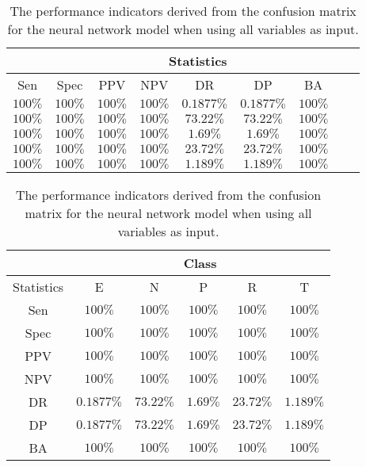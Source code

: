 \begin{table}[!ht]
	\centering
	\begin{tabular}{|c|c|c|c|c|c|c|c|c|}
		\hline
		 & \multicolumn{7}{c|}{Statistics} \\ \hline
		Sen & Spec & PPV & NPV & DR & DP & BA \\ \hline
		$100\%$ & $100\%$ & $100\%$ & $100\%$ & $0.1877\%$ & $0.1877\%$ & $100\%$ \\ \hline
		$100\%$ & $100\%$ & $100\%$ & $100\%$ & $73.22\%$ & $73.22\%$ & $100\%$ \\ \hline
		$100\%$ & $100\%$ & $100\%$ & $100\%$ & $1.69\%$ & $1.69\%$ & $100\%$ \\ \hline
		$100\%$ & $100\%$ & $100\%$ & $100\%$ & $23.72\%$ & $23.72\%$ & $100\%$ \\ \hline
		$100\%$ & $100\%$ & $100\%$ & $100\%$ & $1.189\%$ & $1.189\%$ & $100\%$ \\ \hline
	\end{tabular}
	\caption{The performance indicators derived from the confusion matrix for the neural network model when using all variables as input.}
	\label{tab:cs:all:nnet}
\end{table}

\begin{table}[!ht]
	\centering
	\begin{tabular}{|c|c|c|c|c|c|}
		\hline
		 & \multicolumn{5}{c|}{Class} \\ \hline
		Statistics & E & N & P & R & T \\ \hline
		Sen & $100\%$ & $100\%$ & $100\%$ & $100\%$ & $100\%$ \\ \hline
		Spec & $100\%$ & $100\%$ & $100\%$ & $100\%$ & $100\%$ \\ \hline
		PPV & $100\%$ & $100\%$ & $100\%$ & $100\%$ & $100\%$ \\ \hline
		NPV & $100\%$ & $100\%$ & $100\%$ & $100\%$ & $100\%$ \\ \hline
		DR & $0.1877\%$ & $73.22\%$ & $1.69\%$ & $23.72\%$ & $1.189\%$ \\ \hline
		DP & $0.1877\%$ & $73.22\%$ & $1.69\%$ & $23.72\%$ & $1.189\%$ \\ \hline
		BA & $100\%$ & $100\%$ & $100\%$ & $100\%$ & $100\%$ \\ \hline
	\end{tabular}
	\caption{The performance indicators derived from the confusion matrix for the neural network model when using all variables as input.}
	\label{tab:cs:reverse:all:nnet}
\end{table}

